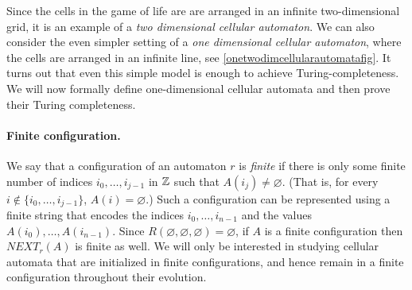 Since the cells in the game of life are are arranged in an infinite
two-dimensional grid, it is an example of a \emph{two dimensional
cellular automaton}. We can also consider the even simpler setting of a
\emph{one dimensional cellular automaton}, where the cells are arranged
in an infinite line, see \cref{onetwodimcellularautomatafig}. It turns
out that even this simple model is enough to achieve
Turing-completeness. We will now formally define one-dimensional
cellular automata and then prove their Turing completeness.

\hypertarget{cellautomatadef}{}

\paragraph{Finite configuration.} We say that a configuration of an
automaton \(r\) is \emph{finite} if there is only some finite number of
indices \(i_0,\ldots,i_{j-1}\) in \({\mathbb{Z}}\) such that
\(A(i_j) \neq \varnothing\). (That is, for every
\(i \not\in \{ i_0, \ldots, i_{j-1}\}\), \(A(i)=\varnothing\).) Such a
configuration can be represented using a finite string that encodes the
indices \(i_0,\ldots,i_{n-1}\) and the values
\(A(i_0),\ldots,A(i_{n-1})\). Since
\(R(\varnothing,\varnothing,\varnothing)=\varnothing\), if \(A\) is a
finite configuration then \(\ensuremath{\mathit{NEXT}}_r(A)\) is finite
as well. We will only be interested in studying cellular automata that
are initialized in finite configurations, and hence remain in a finite
configuration throughout their evolution.

